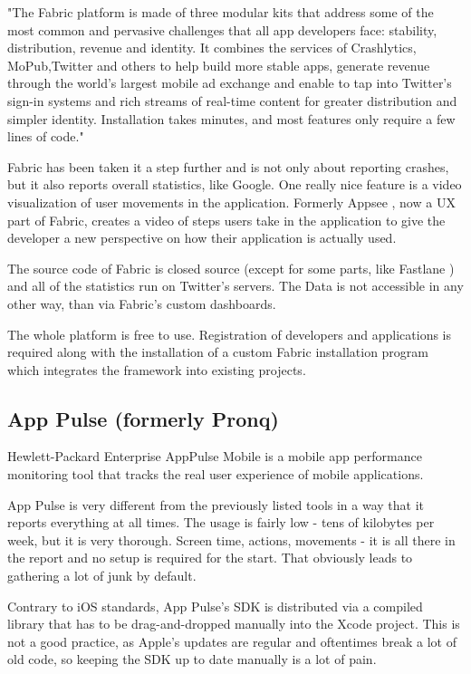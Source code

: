 "The Fabric platform is made of three modular kits that address some of the most common and pervasive challenges that all app developers face: stability, distribution, revenue and identity. It combines the services of Crashlytics, MoPub,Twitter and others to help build more stable apps, generate revenue through the world’s largest mobile ad exchange and enable to tap into Twitter’s sign-in systems and rich streams of real-time content for greater distribution and simpler identity. Installation takes minutes, and most features only require a few lines of code." \cite{fabric}

\bigbreak

Fabric has been taken it a step further and is not only about reporting crashes, but it also reports overall statistics, like Google. One really nice feature is a video visualization of user movements in the application. Formerly Appsee \cite{appsee}, now a UX part of Fabric, creates a video of steps users take in the application to give the developer a new perspective on how their application is actually used.

The source code of Fabric is closed source (except for some parts, like Fastlane \cite{fastlane}) and all of the statistics run on Twitter's servers. The Data is not accessible in any other way, than via Fabric's custom dashboards. 

The whole platform is free to use. Registration of developers and applications is required along with the installation of a custom Fabric installation program which integrates the framework into existing projects.

\subsection{App Pulse (formerly Pronq)}

Hewlett-Packard Enterprise AppPulse Mobile is a mobile app performance monitoring tool that tracks the real user experience of mobile applications.

App Pulse is very different from the previously listed tools in a way that it reports everything at all times. The usage is fairly low - tens of kilobytes per week, but it is very thorough. Screen time, actions, movements - it is all there in the report and no setup is required for the start. That obviously leads to gathering a lot of junk by default.

Contrary to iOS standards, App Pulse's SDK is distributed via a compiled library that has to be drag-and-dropped manually into the Xcode project. This is not a good practice, as Apple's updates are regular and oftentimes break a lot of old code, so keeping the SDK up to date manually is a lot of pain.

